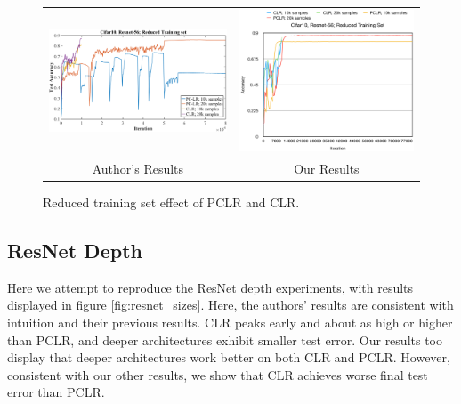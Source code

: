 \documentclass[10pt,twocolumn,letterpaper]{article}
\begin{document}
\begin{figure}[ht!]
    \begin{tabular}{cc}
        \includegraphics[trim=0 0 0 0, clip,
            width=3.25in]{images/figure_6a.png} &
        \includegraphics[trim=0 0 0 0, clip,
            width=3.25in]{images/reduced_training_set.png} \\
        Author's Results & Our Results \\
    \end{tabular}
    \caption{Reduced training set effect of PCLR and CLR.}
    \label{fig:reduced_training_set}
\end{figure}

\subsection{ResNet Depth}
Here we attempt to reproduce the ResNet depth experiments, with results
displayed in figure \ref{fig:resnet_sizes}. Here, the authors' results are
consistent with intuition and their previous results. CLR peaks early and about
as high or higher than PCLR, and deeper architectures exhibit smaller test
error. Our results too display that deeper architectures work better on both
CLR and PCLR. However, consistent with our other results, we show that CLR
achieves worse final test error than PCLR.
\end{document}

